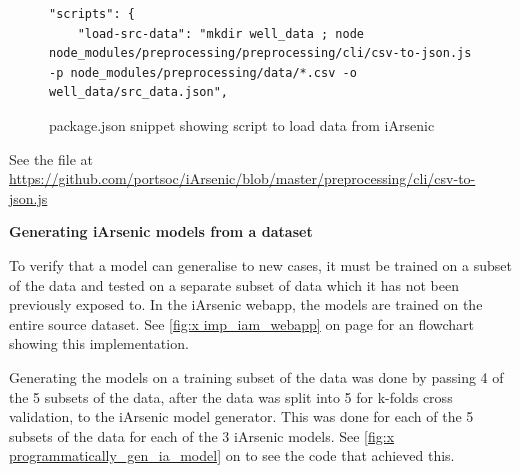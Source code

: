 \begin{figure}[h]
\begin{verbatim}
"scripts": {
    "load-src-data": "mkdir well_data ; node node_modules/preprocessing/preprocessing/cli/csv-to-json.js -p node_modules/preprocessing/data/*.csv -o well_data/src_data.json",
\end{verbatim}
\label{fig:x load_ia_data}
\caption{package.json snippet showing script to load data from iArsenic}
\end{figure}

See the file at \url{https://github.com/portsoc/iArsenic/blob/master/preprocessing/cli/csv-to-json.js}

\textbf{Generating iArsenic models from a dataset}

To verify that a model can generalise to new cases, it must be trained on a subset of the data and tested on a separate subset of data which it has not been previously exposed to. In the iArsenic webapp, the models are trained on the entire source dataset. See \ref{fig:x imp_iam_webapp} on page \pageref{fig:x imp_iam_webapp} for an flowchart showing this implementation.

Generating the models on a training subset of the data was done by passing 4 of the 5 subsets of the data, after the data was split into 5 for k-folds cross validation, to the iArsenic model generator. This was done for each of the 5 subsets of the data for each of the 3 iArsenic models. See \ref{fig:x programmatically_gen_ia_model} on \pageref{fig:x programmatically_gen_ia_model} to see the code that achieved this.

